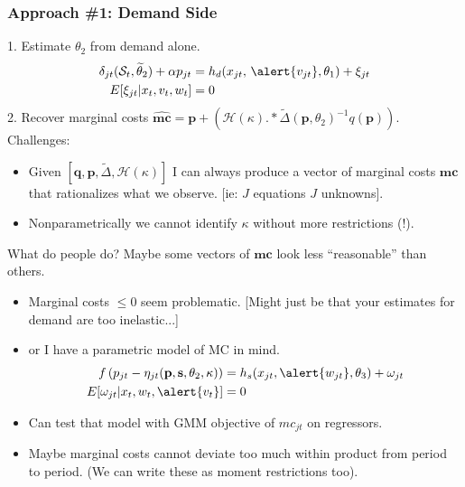 \documentclass[xcolor=pdftex,dvipsnames,table,mathserif,aspectratio=169]{beamer}
\begin{document}
\begin{frame}
\frametitle{Approach \#1: Demand Side}
1. Estimate $\theta_2$ from demand alone.
\begin{align*}
\delta_{jt}(\mathcal{S}_t,\widetilde{\theta}_2) + \alpha p_{jt} &= h_d(x_{jt}, \, \alert{v_{jt}},\theta_1)  + \xi_{jt} \\
E[\xi_{jt} | x_{t}, v_{t}, w_{t}] &=0
\end{align*}
2. Recover marginal costs $\widehat{\mathbf{mc}} = \mathbf{p} +(\mathcal{H}(\kappa).*\tilde{\Delta}(\mathbf{p},\theta_2)^{-1} q(\mathbf{p}))$.\\
\vspace{0.2cm}
Challenges:
\begin{itemize}
\item Given $[\mathbf{q},\mathbf{p},\tilde{\Delta},\mathcal{H}(\kappa)]$ I can always produce a vector of marginal costs $\mathbf{mc}$ that rationalizes what we observe. [ie: $J$ equations $J$ unknowns].
\item Nonparametrically we cannot identify $\kappa$ without more restrictions (!).
\end{itemize}
\end{frame}

\begin{frame}{What do people do?}
Maybe some vectors of $\mathbf{mc}$ look less ``reasonable'' than others.
\begin{itemize}
\item Marginal costs $\leq 0$ seem problematic. [Might just be that your estimates for demand are too inelastic...]
\item or I have a parametric model of MC in mind. 
\begin{align*}
 f \left( p_{jt} - \eta_{jt}(\mathbf{p},\mathbf{s},\theta_2,\kappa) \right) &= h_s(x_{jt}, \alert{w_{jt}},\theta_3) + \omega_{jt}\\
 E[\omega_{jt} | x_{t}, w_{t}, \alert{v_{t}}]&=0
\end{align*}
\item Can test that model with GMM objective of $mc_{jt}$ on regressors.
\item Maybe marginal costs cannot deviate too much within product from period to period. (We can write these as moment restrictions too).
\end{itemize}
\end{frame}
\end{document}
